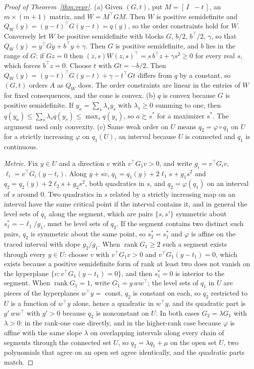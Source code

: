 \documentclass{article}
\theoremstyle{definition}
\theoremstyle{remark}
\begin{document}
\begin{proof}[Proof of Theorem~\ref{thm:repr}]
(a) Given $(G,t)$, put $M=[\,I\;\;-t\,]$, an $m\times(m+1)$ matrix, and $W=M^{\top}GM$.
Then $W$ is positive semidefinite and $Q_{W}(y)=(y-t)^{\top}G(y-t)=q(y)$, so the order constraints hold for $W$.
Conversely let $W$ be positive semidefinite with blocks $G$, $b/2$, $b^{\top}/2$, $\gamma$, so that $Q_{W}(y)=y^{\top}Gy+b^{\top}y+\gamma$.
Then $G$ is positive semidefinite, and $b$ lies in the range of $G$: if $Gz=0$ then $(z,s)W(z,s)^{\top}=s\,b^{\top}z+\gamma s^{2}\ge0$ for every real $s$, which forces $b^{\top}z=0$.
Choose $t$ with $Gt=-b/2$.
Then $Q_{W}(y)=(y-t)^{\top}G(y-t)+\gamma-t^{\top}Gt$ differs from $q$ by a constant, so $(G,t)$ orders $A$ as $Q_{W}$ does.
The order constraints are linear in the entries of $W$ for fixed consequences, and the cone is convex.
(b) $q$ is convex because $G$ is positive semidefinite.
If $y_{a}=\sum_{s}\lambda_{s}y_{s}$ with $\lambda_{s}\ge0$ summing to one, then $q(y_{a})\le\sum_{s}\lambda_{s}q(y_{s})\le\max_{s}q(y_{s})$, so $a\succsim s^{*}$ for a maximizer $s^{*}$.
The argument used only convexity.
(c) Same weak order on $U$ means $q_{2}=\varphi\circ q_{1}$ on $U$ for a strictly increasing $\varphi$ on $q_{1}(U)$, an interval because $U$ is connected and $q_{1}$ is continuous.

\emph{Metric.}
Fix $y\in U$ and a direction $v$ with $v^{\top}G_{1}v>0$, and write $g_{i}=v^{\top}G_{i}v$, $\ell_{i}=v^{\top}G_{i}(y-t_{i})$.
Along $y+sv$, $q_{1}=q_{1}(y)+2\ell_{1}s+g_{1}s^{2}$ and $q_{2}=q_{2}(y)+2\ell_{2}s+g_{2}s^{2}$, both quadratics in $s$, and $q_{2}=\varphi(q_{1})$ on an interval of $s$ around $0$.
Two quadratics in $s$ related by a strictly increasing map on an interval have the same critical point if the interval contains it, and in general the level sets of $q_{1}$ along the segment, which are pairs $\{s,s'\}$ symmetric about $s^{*}_{1}=-\ell_{1}/g_{1}$, must be level sets of $q_{2}$.
If the segment contains two distinct such pairs, $q_{2}$ is symmetric about the same point, so $s^{*}_{2}=s^{*}_{1}$ and $\varphi$ is affine on the traced interval with slope $g_{2}/g_{1}$.
When $\operatorname{rank}G_{1}\ge2$ such a segment exists through every $y\in U$: choose $v$ with $v^{\top}G_{1}v>0$ and $v^{\top}G_{1}(y-t_{1})=0$, which exists because a positive semidefinite form of rank at least two does not vanish on the hyperplane $\{v:v^{\top}G_{1}(y-t_{1})=0\}$, and then $s^{*}_{1}=0$ is interior to the segment.
When $\operatorname{rank}G_{1}=1$, write $G_{1}=g\,ww^{\top}$; the level sets of $q_{1}$ in $U$ are pieces of the hyperplanes $w^{\top}y=$ const, $q_{2}$ is constant on each, so $q_{2}$ restricted to $U$ is a function of $w^{\top}y$ alone, hence a quadratic in $w^{\top}y$, and its quadratic part is $g'\,ww^{\top}$ with $g'>0$ because $q_{2}$ is nonconstant on $U$.
In both cases $G_{2}=\lambda G_{1}$ with $\lambda>0$: in the rank-one case directly, and in the higher-rank case because $\varphi$ is affine with the same slope $\lambda$ on overlapping intervals along every chain of segments through the connected set $U$, so $q_{2}=\lambda q_{1}+\mu$ on the open set $U$, two polynomials that agree on an open set agree identically, and the quadratic parts match.


\end{proof}
\end{document}
